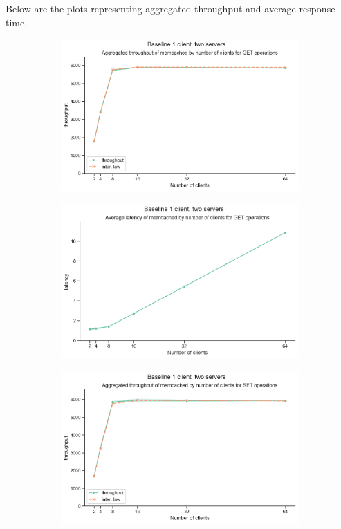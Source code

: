 \documentclass[11pt,a4paper]{article}
\begin{document}
Below are the plots representing aggregated throughput and average response time. 

\begin{figure}[H]
	\begin{subfigure}[b]{0.5\linewidth}
		\includegraphics[width=\linewidth]{images/baseline_2/last_graph_get_throughput.pdf}
	\end{subfigure}
	\begin{subfigure}[b]{0.5\linewidth}
		\includegraphics[width=\linewidth]{images/baseline_2/last_graph_get_latency.pdf}
	\end{subfigure}
	\begin{subfigure}[b]{0.5\linewidth}
		\includegraphics[width=\linewidth]{images/baseline_2/last_graph_set_throughput.pdf}

\end{subfigure}
\end{figure}
\end{document}
